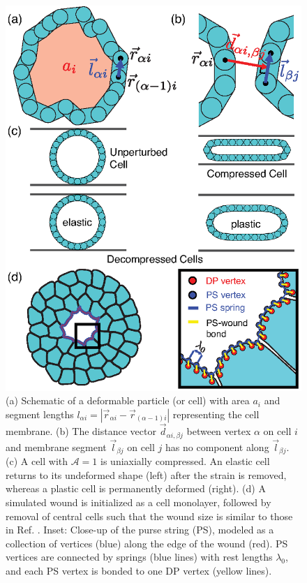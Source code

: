 \documentclass[%
 reprint,
superscriptaddress,
amsmath,amssymb,
prl,
floatfix,
]{revtex4-2}
\begin{document}
\begin{figure}[!t]
    \centering
    \includegraphics[width=\linewidth]{Fig2.eps}
\caption{(a) Schematic of a deformable particle (or cell) with area $a_i$ and segment lengths $l_{\alpha i} = |\vec{r}_{\alpha i}- \vec{r}_{(\alpha-1) i}|$ representing the cell membrane. (b) The distance vector ${\vec d}_{\alpha i,\beta j}$ between vertex $\alpha$ on cell $i$ and membrane segment ${\vec l}_{\beta j}$ on cell $j$ has no component along ${\vec l}_{\beta j}$. (c) A cell with $\mathcal{A}=1$ is uniaxially compressed. An elastic cell returns to its undeformed shape (left) after the strain is removed, whereas a plastic cell is permanently deformed (right). (d) A simulated wound is initialized as a cell monolayer, followed by removal of central cells such that the wound size is similar to those in Ref. \cite{tetley2019tissue}. Inset: Close-up of the purse string (PS), modeled as a collection of vertices (blue) along the edge of the wound (red). PS vertices are connected by springs (blue lines) with rest lengths $\lambda_0$, and each PS vertex is bonded to one DP vertex (yellow lines). 
}
\label{fig:modelSchematic}
\end{figure}
\end{document}
